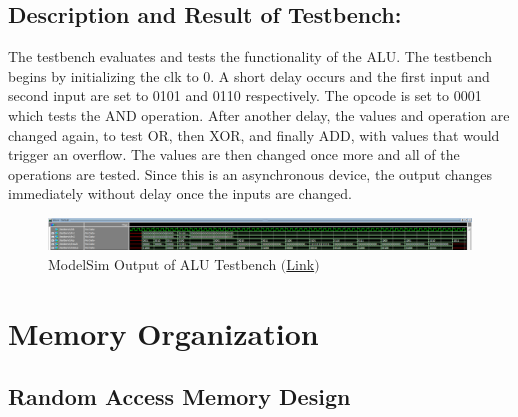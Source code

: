 \documentclass[10pt,letterpaper]{article}
\begin{document}
\subsection{Description and Result of Testbench:}
The testbench evaluates and tests the functionality of the ALU. The testbench begins by initializing the clk to 0. A short delay occurs and the first input and second input are set to 0101 and 0110 respectively. The opcode is set to 0001 which tests the AND operation. After another delay, the values and operation are changed again, to test OR, then XOR, and finally ADD, with values that would trigger an overflow. The values are then changed once more and all of the operations are tested. Since this is an asynchronous device, the output changes immediately without delay once the inputs are changed.
\begin{figure}[H]
	\centering
	\includegraphics[width=\linewidth]{Figures/ALUTB}
	\caption{ModelSim Output of ALU Testbench \href{https://drive.google.com/file/d/1bQqGJ2kdPRX3t6CaRQ6nDrtCmVe9OP3k/view?usp=sharing}{$($Link$)$}}
	\label{fig:alutb}
\end{figure}
\newpage
\section{Memory Organization}
\subsection{Random Access Memory Design}
\end{document}
